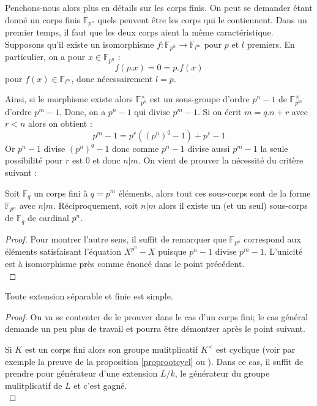 \documentclass[a4paper]{article} %
\numberwithin{equation}{section}
\newcommand\GF[1]{\mathbb{F}_{#1}}
\begin{document}
Penchons-nous alors plus en détails sur les corps finis. On peut se demander
étant donné un corps finis $\GF{p^n}$ quels peuvent être les corps qui le
contiennent. Dans un premier temps, il faut que les deux corps aient la même
caractéristique. Supposons qu'il existe un isomorphisme $f : \GF{p^n} \to 
\GF{l^m}$ pour $p$ et $l$ premiers. En particulier, on a pour $x\in\GF{p^n}$ :
\[f(p.x) = 0 = p.f(x)\]
pour $f(x)\in\GF{l^m}$, donc nécessairement $l = p$.\par
Ainsi, si le morphisme existe alors $\GF{p^n}^{\times}$ est un sous-groupe
d'ordre $p^n - 1$ de $\GF{p^m}^{\times}$ d'ordre $p^m - 1$. Donc, on a $p^n - 1$
qui divise $p^m - 1$. Si on écrit $m = q.n + r$ avec $r < n$ alors on obtient :
\[p^m - 1 = p^r((p^n)^q - 1) + p^r - 1\]
Or $p^n - 1$ divise $(p^n)^q - 1$ donc comme $p^n - 1$ divise aussi $p^m - 1$ la
seule possibilité pour $r$ est $0$ et donc $n|m$. On vient de prouver la
nécessité du critère suivant :

\begin{prop}
Soit $\GF{q}$ un corps fini à $q = p^m$ éléments, alors tout ces sous-corps sont
de la forme $\GF{p^n}$ avec $n|m$. Réciproquement, soit $n|m$ alors il existe un
(et un seul) sous-corps de $\GF{q}$ de cardinal $p^n$.
\end{prop}
\begin{proof}
Pour montrer l'autre sens, il suffit de remarquer que $\GF{p^n}$ correspond aux
éléments satisfaisant l'équation $X^{p^n} - X$ puisque $p^n - 1$ divise $p^m -
1$. L'unicité est à isomorphisme près comme énoncé dans le point précédent.\\
\end{proof}

\begin{thm}
\label{thelemprim}
Toute extension séparable et finie est simple.
\end{thm}
\begin{proof}
On va se contenter de le prouver dans le cas d'un corps fini; le cas général
demande un peu plus de travail et pourra être démontrer après le point
suivant.\par
Si $K$ est un corps fini alors son groupe mulitplicatif $K^{\times}$ est
cyclique (voir par exemple la preuve de la proposition \ref{proprootcycl} ou
\cite[p.~50]{LiNi}). Dans ce cas, il suffit de prendre pour générateur d'une
extension $L/k$, le générateur du groupe mulitplicatif de $L$ et c'est gagné.\\
\end{proof}
\end{document}
